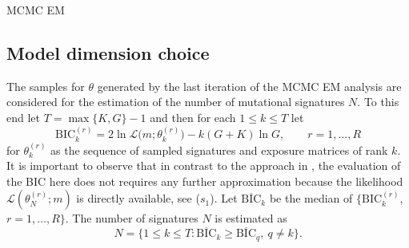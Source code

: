 \documentclass{bioinfo}
\makeatletter
\def\BState{\State\hskip-\ALG@thistlm}
\makeatother
\begin{document}
\begin{algorithm}
\caption{MCMC EM}\label{alg:mcmc}
\end{algorithm}

\subsection{Model dimension choice}
The samples for $\theta$ generated by the last iteration of the
MCMC EM analysis are considered for the estimation of the number 
of mutational signatures $N$. To this end let $T = \max\{K, G\} -1$
and then for each $1 \leq k \leq T$ let
\[
  \text{BIC}_k^{(r)} = 2\ln\mathcal L\big(m;
    \theta^{(r)}_{k}\big) - k(G+K)\ln G, \qquad r =1, \ldots,
    R
\]
for $\theta^{(r)}_k$ as the sequence of sampled signatures and
exposure matrices of rank $k$. It is important to observe that in
contrast to the approach in \cite{FICMV}, the evaluation of the BIC
here does not requires any further approximation because the
likelihood $\mathcal L(\theta^{(r)}_N; m)$ is directly available, see
($s_1$).  Let $\overline{\text{BIC}}_k$ be the median of 
$\{\text{BIC}_k^{(r)}$, $r = 1, \ldots, R\}$. The number of signatures
$N$ is estimated as
\[
   N 
   = 
   \big\{1 \leq k \leq T:  \overline{\text{BIC}}_k \geq
    \overline{\text{BIC}}_q,\ q\neq k \big\}.
\]
\end{document}

